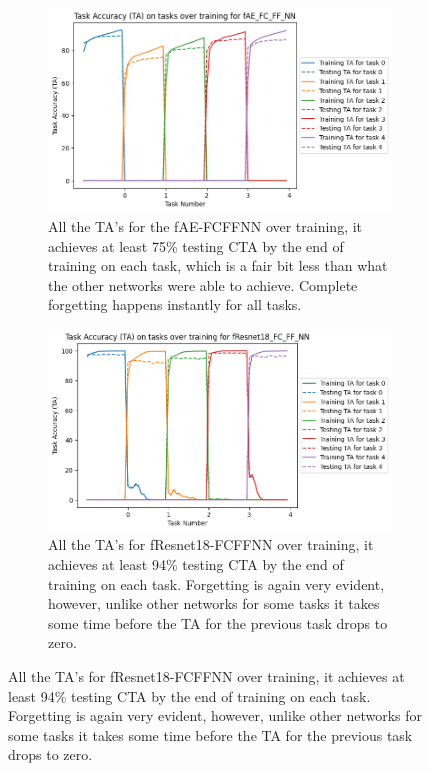 \begin{figure}[ht]
    \begin{subfigure}[t]{0.4\textwidth}
       \includegraphics[width=\linewidth]{images/CIFAR10_CL/fAE_FC_FF_NN_TA_task.png}
       \caption{All the TA's for the fAE-FCFFNN over training, it achieves at least 75\% testing CTA by the end of training on each task, which is a fair bit less than what the other networks were able to achieve. Complete forgetting happens instantly for all tasks.}
    \end{subfigure}
    \quad %
    \begin{subfigure}[t]{0.4\textwidth}
       \includegraphics[width=\linewidth]{images/CIFAR10_CL/fResnet18_FC_FF_NN_TA_task.png}
       \caption{All the TA's for fResnet18-FCFFNN over training, it achieves at least 94\% testing CTA by the end of training on each task. Forgetting is again very evident, however, unlike other networks for some tasks it takes some time before the TA for the previous task drops to zero.}
    \end{subfigure}

    \medskip %


\end{figure}

